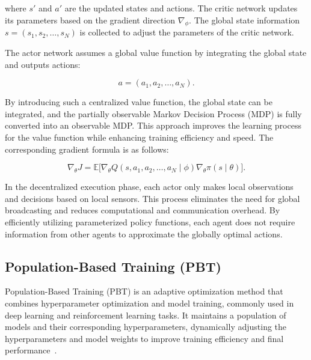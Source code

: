 \documentclass[preprint,12pt]{elsarticle}
\begin{document}
where $s'$ and $a'$ are the updated states and actions. The critic network updates its parameters based on the 
gradient direction $\nabla_\phi$. The global state information $s = (s_1, s_2, \ldots, s_N)$ is collected to
 adjust the parameters of the critic network.

The actor network assumes a global value function by integrating the global state and outputs actions:

\begin{equation}
a = (a_1, a_2, \ldots, a_N).
\end{equation}

By introducing such a centralized value function, the global state can be integrated, and the partially 
observable Markov Decision Process (MDP) is fully converted into an observable MDP. This approach improves 
the learning process for the value function while enhancing training efficiency and speed. The corresponding 
gradient formula is as follows:

\begin{equation}
\nabla_\theta J = \mathbb{E}\bigl[\nabla_\theta Q(s, a_1, a_2, \ldots, a_N \mid \phi) \nabla_\theta \pi(s \mid \theta)\bigr].
\end{equation}

In the decentralized execution phase, each actor only makes local observations and decisions 
based on local sensors. This process eliminates the need for global broadcasting and reduces computational 
and communication overhead. By efficiently utilizing parameterized policy functions, each agent does not 
require information from other agents to approximate the globally optimal actions.
\subsection{Population-Based Training (PBT)}


Population-Based Training (PBT) is an adaptive optimization method that combines 
hyperparameter optimization and model training, commonly used in deep learning and 
reinforcement learning tasks. It maintains a population of models and their corresponding 
hyperparameters, dynamically adjusting the hyperparameters and model weights to improve 
training efficiency and final performance~\cite{ref23}.
\end{document}
